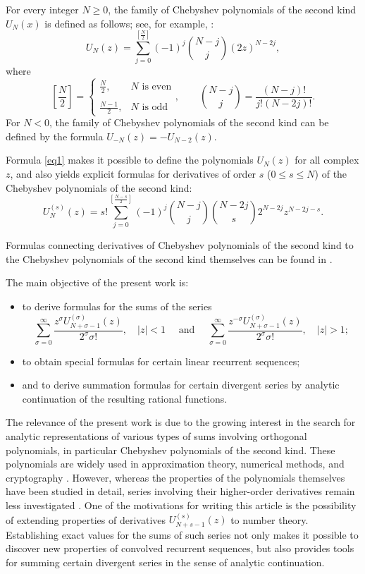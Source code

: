 \documentclass{article}
\begin{document}
For every integer $N \geq 0$, the family of Chebyshev polynomials of the second kind $U_N(x)$ is defined as follows; see, for example, \cite{ref1}:
\begin{equation}\label{eq1}
U_N(z) = \sum_{j = 0}^{\left[\frac{N}{2}\right]}(-1)^j{N - j \choose j}(2z)^{N - 2j},
\end{equation}
where
$$
\left[\frac{N}{2}\right] = \begin{cases}
\frac{N}{2}, & N \mbox{ is even} \\
\\
\frac{N-1}{2}, & N \mbox{ is odd}
\end{cases}, \qquad
{N - j \choose j} = \frac{(N - j)!}{j!(N - 2j)!}.
$$
For $N < 0$, the family of Chebyshev polynomials of the second kind can be defined by the formula $U_{-N}(z) = -U_{N - 2}(z)$.

Formula \eqref{eq1} makes it possible to define the polynomials $U_N(z)$ for all complex $z$, and also yields explicit formulas for derivatives of order $s$ ($0 \leq s \leq N$) of the Chebyshev polynomials of the second kind:
$$
U_N^{(s)}(z) = s!\sum_{j = 0}^{\left[\frac{N - s}{2}\right]}(-1)^j{N - j \choose j}{N - 2j \choose s}2^{N - 2j}z^{N - 2j - s}.
$$

Formulas connecting derivatives of Chebyshev polynomials of the second kind to the Chebyshev polynomials of the second kind themselves can be found in \cite{ref1,ref2,ref3,ref4}.

The main objective of the present work is: 
\begin{itemize}
\item to derive formulas for the sums of the series
$$
\sum_{\sigma = 0}^{\infty}\frac{z^\sigma U_{N + \sigma - 1}^{(\sigma)}(z)}{2^\sigma \sigma!}, \quad |z| < 1 \quad \mbox{ and } \quad \sum_{\sigma = 0}^{\infty}\frac{z^{-\sigma} U_{N + \sigma - 1}^{(\sigma)}(z)}{2^\sigma \sigma!}, \quad |z| > 1;
$$
\item to obtain special formulas for certain linear recurrent sequences; 
\item and to derive summation formulas for certain divergent series by analytic continuation of the resulting rational functions.
\end{itemize}

The relevance of the present work is due to the growing interest in the search for analytic representations of various types of sums involving orthogonal polynomials, in particular Chebyshev polynomials of the second kind. These polynomials are widely used in approximation theory, numerical methods, and cryptography \cite{ref5}. However, whereas the properties of the polynomials themselves have been studied in detail, series involving their higher-order derivatives remain less investigated \cite{ref6}. One of the motivations for writing this article is the possibility of extending properties of derivatives $U_{N + s - 1}^{(s)}(z)$ to number theory. Establishing exact values for the sums of such series not only makes it possible to discover new properties of convolved recurrent sequences, but also provides tools for summing certain divergent series in the sense of analytic continuation.
\end{document}
